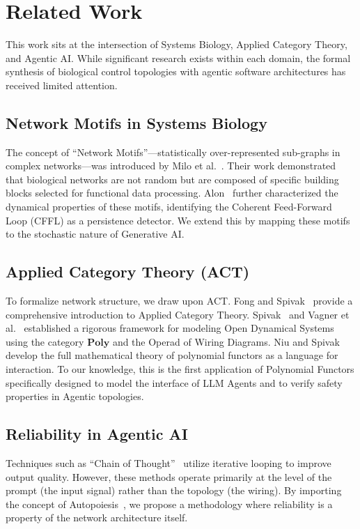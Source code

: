 \section{Related Work}

This work sits at the intersection of Systems Biology, Applied Category Theory, and Agentic AI. While significant
research exists within each domain, the formal synthesis of biological control topologies with agentic software
architectures has received limited attention.

\subsection{Network Motifs in Systems Biology}

The concept of ``Network Motifs''---statistically over-represented sub-graphs in complex networks---was introduced
by Milo et al.~\cite{milo2002network}. Their work demonstrated that biological networks are not random but are composed of specific
building blocks selected for functional data processing. Alon~\cite{alon2007network} further characterized the dynamical properties
of these motifs, identifying the Coherent Feed-Forward Loop (CFFL) as a persistence detector. We extend this by
mapping these motifs to the stochastic nature of Generative AI.

\subsection{Applied Category Theory (ACT)}

To formalize network structure, we draw upon ACT. Fong and Spivak~\cite{fong2019seven} provide a comprehensive introduction to Applied Category Theory. Spivak~\cite{spivak2021learners} and Vagner et al.~\cite{vagner2015algebras} established a rigorous framework
for modeling Open Dynamical Systems using the category $\mathbf{Poly}$ and the Operad of Wiring Diagrams. Niu and Spivak~\cite{niu2023polynomial} develop the full mathematical theory of polynomial functors as a language for interaction. To our
knowledge, this is the first application of Polynomial Functors specifically designed to model the interface of
LLM Agents and to verify safety properties in Agentic topologies.

\subsection{Reliability in Agentic AI}

Techniques such as ``Chain of Thought''~\cite{wei2022chain} utilize iterative looping to improve output quality. However, these
methods operate primarily at the level of the prompt (the input signal) rather than the topology (the wiring).
By importing the concept of Autopoiesis~\cite{maturana1980autopoiesis}, we propose a methodology where reliability is a property of the
network architecture itself.

